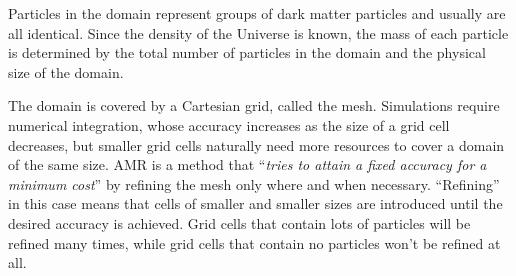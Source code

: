 Particles in the domain represent groups of dark matter particles and usually are all identical.
Since the density of the Universe is known, the mass of each particle is determined by the total number of particles in the domain and the physical size of the domain.

The domain is covered by a Cartesian grid, called the mesh.
Simulations require numerical integration, whose accuracy increases as the size of a grid cell decreases, but smaller grid cells naturally need more resources to cover a domain of the same size.
AMR is a method that ``\textit{tries to attain a fixed accuracy for a minimum cost}'' \parencite{AMR} by refining the mesh only where and when necessary.
``Refining'' in this case means that cells of smaller and smaller sizes are introduced until the desired accuracy is achieved.
Grid cells that contain lots of particles will be refined many times, while grid cells that contain no particles won't be refined at all.




